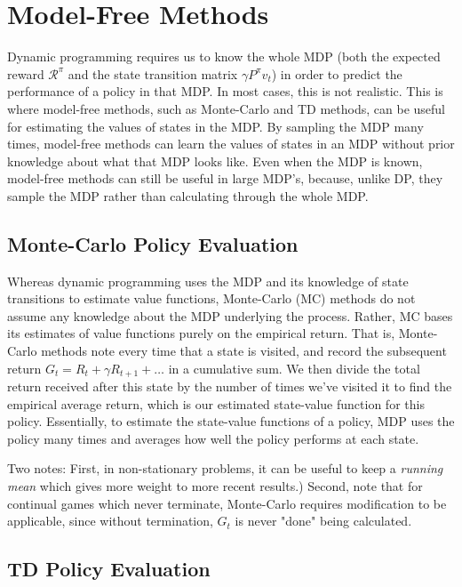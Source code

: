 \documentclass{article}
\newcommand{\ita}{\textit}
\begin{document}
\section{Model-Free Methods}

Dynamic programming requires us to know the whole MDP (both the expected reward $\mathcal{R}^\pi$ and the state transition matrix $\gamma P^\pi v_t$) in order to predict the performance of a policy in that MDP. In most cases, this is not realistic. This is where model-free methods, such as Monte-Carlo and TD methods, can be useful for estimating the values of states in the MDP. By sampling the MDP many times, model-free methods can learn the values of states in an MDP without prior knowledge about what that MDP looks like. Even when the MDP is known, model-free methods can still be useful in large MDP's, because, unlike DP, they sample the MDP rather than calculating through the whole MDP.

\subsection{Monte-Carlo Policy Evaluation}

Whereas dynamic programming uses the MDP and its knowledge of state transitions to estimate value functions, Monte-Carlo (MC) methods do not assume any knowledge about the MDP underlying the process. Rather, MC bases its estimates of value functions purely on the empirical return. That is, Monte-Carlo methods note every time that a state is visited, and record the subsequent return $G_t = R_t + \gamma R_{t+1} + \ldots$ in a cumulative sum. We then divide the total return received after this state by the number of times we've visited it to find the empirical average return, which is our estimated state-value function for this policy. Essentially, to estimate the state-value functions of a policy, MDP uses the policy many times and averages how well the policy performs at each state. 

Two notes: First, in non-stationary problems, it can be useful to keep a \ita{running mean} which gives more weight to more recent results.) Second, note that for continual games which never terminate, Monte-Carlo requires modification to be applicable, since without termination, $G_t$ is never "done" being calculated.

\subsection{TD Policy Evaluation}
\end{document}
